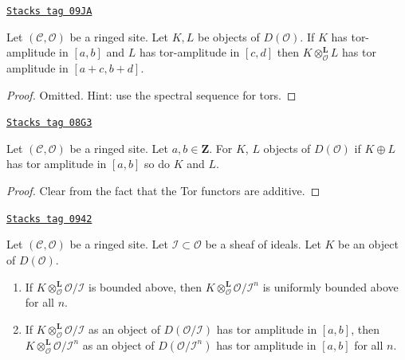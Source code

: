 \begin{lemma}
\label{sites-cohomology-lemma-tensor-tor-amplitude}
\href{https://stacks.math.columbia.edu/tag/09JA}{\texttt{Stacks tag 09JA}}

Let $(\mathcal{C}, \mathcal{O})$ be a ringed site. Let $K, L$ be objects of
$D(\mathcal{O})$. If $K$ has tor-amplitude in $[a, b]$ and
$L$ has tor-amplitude in $[c, d]$ then $K \otimes_\mathcal{O}^\mathbf{L} L$
has tor amplitude in $[a + c, b + d]$.
\end{lemma}

\begin{proof}
Omitted. Hint: use the spectral sequence for tors.
\end{proof}

\begin{lemma}
\label{sites-cohomology-lemma-summands-tor-amplitude}
\href{https://stacks.math.columbia.edu/tag/08G3}{\texttt{Stacks tag 08G3}}

Let $(\mathcal{C}, \mathcal{O})$ be a ringed site. Let $a, b \in \mathbf{Z}$.
For $K$, $L$ objects of $D(\mathcal{O})$ if $K \oplus L$ has tor
amplitude in $[a, b]$ so do $K$ and $L$.
\end{lemma}

\begin{proof}
Clear from the fact that the Tor functors are additive.
\end{proof}

\begin{lemma}[Bounded]
\label{sites-cohomology-lemma-bounded}
\href{https://stacks.math.columbia.edu/tag/0942}{\texttt{Stacks tag 0942}}

Let $(\mathcal{C}, \mathcal{O})$ be a ringed site.
Let $\mathcal{I} \subset \mathcal{O}$ be a sheaf of ideals.
Let $K$ be an object of $D(\mathcal{O})$.
\begin{enumerate}
\item If $K \otimes_\mathcal{O}^\mathbf{L} \mathcal{O}/\mathcal{I}$
is bounded above, then
$K \otimes_\mathcal{O}^\mathbf{L} \mathcal{O}/\mathcal{I}^n$
is uniformly bounded above for all $n$.
\item If $K \otimes_\mathcal{O}^\mathbf{L} \mathcal{O}/\mathcal{I}$
as an object of $D(\mathcal{O}/\mathcal{I})$ has tor amplitude in $[a, b]$,
then $K \otimes_\mathcal{O}^\mathbf{L} \mathcal{O}/\mathcal{I}^n$
as an object of $D(\mathcal{O}/\mathcal{I}^n)$
has tor amplitude in $[a, b]$ for all $n$.
\end{enumerate}
\end{lemma}

